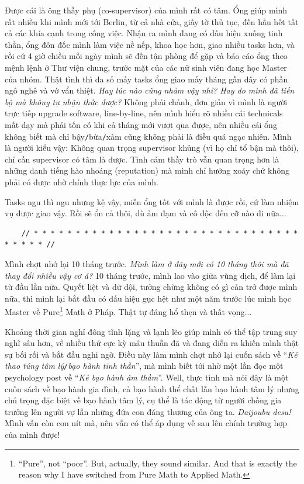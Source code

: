 \documentclass[12pt]{article}
\begin{document}
Được cái là ông thầy phụ (co-supervisor) của mình rất có tâm. Ổng giúp mình rất nhiều khi mình mới tới Berlin, từ cả nhà cửa, giấy tờ thủ tục, đến hầu hết tất cả các khía cạnh trong công việc. Nhận ra mình đang có dấu hiệu xuống tinh thần, ổng đôn đốc mình làm việc nề nếp, khoa học hơn, giao nhiều tasks hơn, và rồi cứ 4 giờ chiều mỗi ngày mình sẽ đến tận phòng để gặp và báo cáo ổng theo mệnh lệnh ở Thư viện chung, trước mặt của các nữ sinh viên đang học Master của nhóm. Thật tình thì đa số mấy tasks ổng giao mấy tháng gần đây có phần ngô nghê và vớ vẩn thiệt. {\it Hay lúc nào cũng nhảm vậy nhỉ? Hay do mình đã tiến bộ mà không tự nhận thức được?} Không phải chảnh, đơn giản vì mình là người trực tiếp upgrade software, line-by-line, nên mình hiểu rõ nhiều cái technicals mất dạy mà phải tốn có khi cả tháng mới vượt qua được, nên nhiều cái ổng không biết mà chỉ bậy{\tt/}bừa{\tt/}xàm cũng không phải là điều quá ngạc nhiên. Mình là người kiểu vậy: Không quan trọng supervisor khủng (vì họ chỉ tổ bận mà thôi), chỉ cần supervisor có tâm là được. Tình cảm thầy trò vẫn quan trọng hơn là những danh tiếng hào nhoáng (reputation) mà mình chỉ hưởng xoáy chứ không phải có được nhờ chính thực lực của mình.

Tasks ngu thì ngu nhưng kệ vậy, miễn ổng tốt với mình là được rồi, cứ làm nhiệm vụ được giao vậy. Rồi sẽ ổn cả thôi, dù ảm đạm và cô độc đến cỡ nào đi nữa$\ldots$

\begin{verbatim}
	// * * * * * * * * * * * * * * * * * * * * * * * * * * * * * * * * * * * * * //
\end{verbatim}

\noindent
{} Mình chợt nhớ lại 10 tháng trước. {\it Mình làm ở đây mới có 10 tháng thôi mà đã thay đổi nhiều vậy cơ á?} 10 tháng trước, mình lao vào giữa vùng dịch, để làm lại từ đầu lần nữa. Quyết liệt và dữ dội, tưởng chừng không có gì cản trở được mình nữa, thì mình lại bắt đầu có dấu hiệu gục hệt như một năm trước lúc mình học Master về Pure\footnote{``Pure'', not ``poor''. But, actually, they sound similar. And that is exactly the reason why I have switched from Pure Math to Applied Math.} Math ở Pháp. Thật tự đáng hổ thẹn và thất vọng$\ldots$

Khoảng thời gian nghỉ đông tĩnh lặng và lạnh lẽo giúp mình có thể tập trung suy nghĩ sâu hơn, về nhiều thứ cực kỳ mâu thuẫn đã và đang diễn ra khiến mình thật sự bối rối và bắt đầu nghi ngờ. Điều này làm mình chợt nhớ lại cuốn sách \cite{Bancroft2003} về ``{\it Kẻ thao túng tâm lý{\tt/}bạo hành tinh thần}'', mà mình biết tới nhờ một lần đọc một psychology post về ``{\it Kẻ bạo hành âm thầm}''. Well, thực tình mà nói đây là một cuốn sách về bạo hành gia đình, cả bạo hành thể chất lẫn bạo hành tâm lý nhưng chú trọng đặc biệt về bạo hành tâm lý, cụ thể là tác động từ người chồng gia trưởng lên người vợ lẫn những đứa con đáng thương của ông ta. {\it Daijoubu desu!} Mình vẫn còn con nít mà, nên vẫn có thể áp dụng vế sau lên chính trường hợp của mình được!
\end{document}
